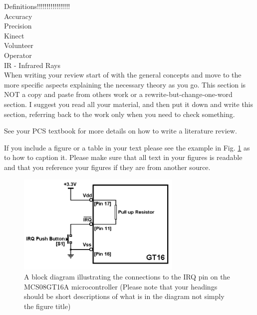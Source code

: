 Definitions!!!!!!!!!!!!!!!!!\\
Accuracy\\
Precision\\
Kinect\\
Volunteer\\
Operator\\
IR - Infrared Rays\\







When writing your review start of with the general concepts and move to the more specific aspects
explaining the necessary theory as you go. This section is NOT a copy and paste from others work or a
rewrite-but-change-one-word section. I suggest you read all your material, and then put it down and
write this section, referring back to the work only when you need to check something.

See your PCS textbook for more details on how to write a literature review.

If you include a figure or a table in your text please see the example in Fig. \ref{fig:model} as to how to caption it.
Please make sure that all text in your figures is readable and that you reference your figures if they are
from another source.

\begin{figure}[ht]
\centering
\includegraphics[width=0.7\textwidth]{model.png}
\caption{A block diagram illustrating the connections to the IRQ pin on the MCS08GT16A microcontroller (Please
note that your headings should be short descriptions of what is in the diagram not simply the figure title)}
\label{fig:model}
\end{figure}

